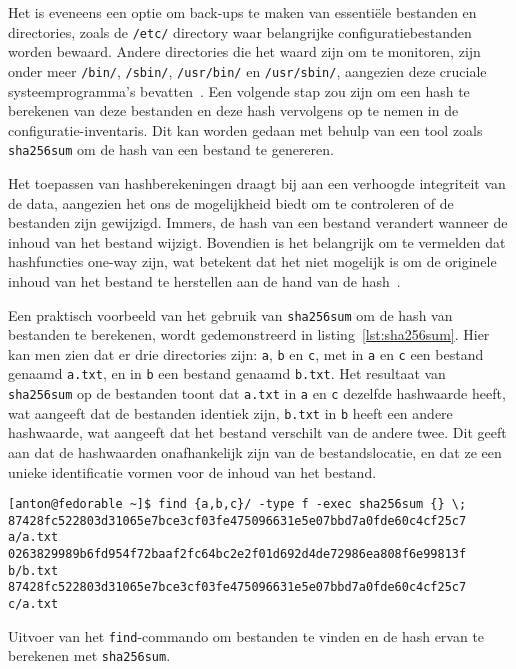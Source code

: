 Het is eveneens een optie om back-ups te maken van essenti\"ele bestanden en directories, zoals de \texttt{/etc/} directory waar belangrijke configuratiebestanden worden bewaard.
Andere directories die het waard zijn om te monitoren, zijn onder meer \texttt{/bin/}, \texttt{/sbin/}, \texttt{/usr/bin/} en \texttt{/usr/sbin/}, aangezien deze cruciale systeemprogramma's bevatten~\autocite{linuxfoundation-filesystem}.
Een volgende stap zou zijn om een hash te berekenen van deze bestanden en deze hash vervolgens op te nemen in de configuratie-inventaris.
Dit kan worden gedaan met behulp van een tool zoals \texttt{sha256sum} om de hash van een bestand te genereren.

Het toepassen van hashberekeningen draagt bij aan een verhoogde integriteit van de data, aangezien het ons de mogelijkheid biedt om te controleren of de bestanden zijn gewijzigd.
Immers, de hash van een bestand verandert wanneer de inhoud van het bestand wijzigt.
Bovendien is het belangrijk om te vermelden dat hashfuncties one-way zijn, wat betekent dat het niet mogelijk is om de originele inhoud van het bestand te herstellen aan de hand van de hash~\autocite{herrero2021file}.

Een praktisch voorbeeld van het gebruik van \texttt{sha256sum} om de hash van bestanden te berekenen, wordt gedemonstreerd in listing~\ref{lst:sha256sum}.
Hier kan men zien dat er drie directories zijn: \texttt{a}, \texttt{b} en \texttt{c}, met in \texttt{a} en \texttt{c} een bestand genaamd \texttt{a.txt}, en in \texttt{b} een bestand genaamd \texttt{b.txt}.
Het resultaat van \texttt{sha256sum} op de bestanden toont dat \texttt{a.txt} in \texttt{a} en \texttt{c} dezelfde hashwaarde heeft, wat aangeeft dat de bestanden identiek zijn, \texttt{b.txt} in \texttt{b} heeft een andere hashwaarde, wat aangeeft dat het bestand verschilt van de andere twee.
Dit geeft aan dat de hashwaarden onafhankelijk zijn van de bestandslocatie, en dat ze een unieke identificatie vormen voor de inhoud van het bestand.

\begin{listing}
  \begin{verbatim}
[anton@fedorable ~]$ find {a,b,c}/ -type f -exec sha256sum {} \;
87428fc522803d31065e7bce3cf03fe475096631e5e07bbd7a0fde60c4cf25c7  a/a.txt
0263829989b6fd954f72baaf2fc64bc2e2f01d692d4de72986ea808f6e99813f  b/b.txt
87428fc522803d31065e7bce3cf03fe475096631e5e07bbd7a0fde60c4cf25c7  c/a.txt
  \end{verbatim}
  \caption{Uitvoer van het \texttt{find}-commando om bestanden te vinden en de hash ervan te berekenen met \texttt{sha256sum}.}
  \label{lst:sha256sum}
\end{listing}

